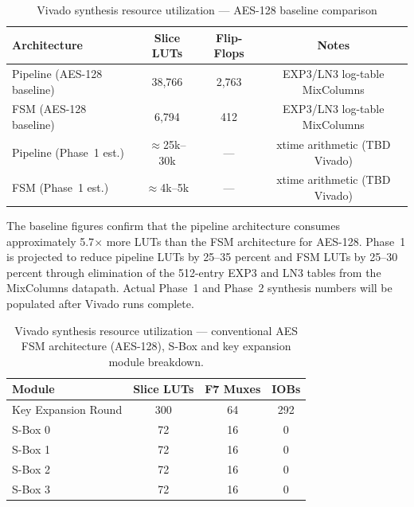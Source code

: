 \begin{table}[!htbp]
    \centering
    \caption{Vivado synthesis resource utilization --- AES-128 baseline comparison}
    \label{tab:aes_baseline_comparison}
    \renewcommand{\arraystretch}{1.15}
    \begin{tabular}{lccc}
        \hline
        \textbf{Architecture} & \textbf{Slice LUTs} & \textbf{Flip-Flops} & \textbf{Notes} \\
        \hline
        Pipeline (AES-128 baseline) & 38,766 & 2,763 & EXP3/LN3 log-table MixColumns \\
        FSM (AES-128 baseline)      &  6,794 &   412 & EXP3/LN3 log-table MixColumns \\
        Pipeline (Phase~1 est.)    & $\approx$25k--30k & --- & xtime arithmetic (TBD Vivado) \\
        FSM (Phase~1 est.)         & $\approx$4k--5k  & --- & xtime arithmetic (TBD Vivado) \\
        \hline
    \end{tabular}
\end{table}

\FloatBarrier

The baseline figures confirm that the pipeline architecture consumes approximately
5.7$\times$ more LUTs than the FSM architecture for AES-128. Phase~1 is projected to
reduce pipeline LUTs by 25--35 percent and FSM LUTs by 25--30 percent through
elimination of the 512-entry EXP3 and LN3 tables from the MixColumns datapath. Actual
Phase~1 and Phase~2 synthesis numbers will be populated after Vivado runs complete.

\begin{table}[!htbp]
    \centering
    \caption{Vivado synthesis resource utilization --- conventional AES FSM
    architecture (AES-128), S-Box and key expansion module breakdown.}
    \label{tab:aes_resources}
    \begin{tabular}{lccc}
        \hline
        \textbf{Module} & \textbf{Slice LUTs} & \textbf{F7 Muxes} & \textbf{IOBs} \\
        \hline
        Key Expansion Round & 300 & 64 & 292 \\
        S-Box 0 & 72 & 16 & 0 \\
        S-Box 1 & 72 & 16 & 0 \\
        S-Box 2 & 72 & 16 & 0 \\
        S-Box 3 & 72 & 16 & 0 \\
        \hline
    \end{tabular}
\end{table}


